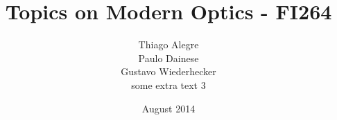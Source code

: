 \title[]{Topics on Modern Optics - FI264}

\author[T. Alegre, P. Dainese \& G. Wiederhecker]{
Thiago Alegre \\
Paulo Dainese \\
Gustavo Wiederhecker\\
\vspace{10pt}
some extra text 3
}

\date{August 2014}